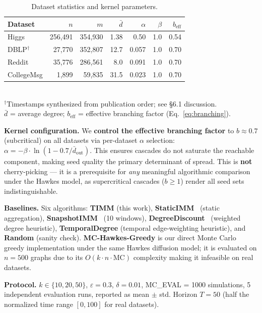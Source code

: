 \documentclass[10pt,conference]{IEEEtran}
\begin{document}
\begin{table}[t]
\centering
\caption{Dataset statistics and kernel parameters.}
\label{tab:datasets}
\small
\begin{tabular}{lrrrrrr}
\toprule
Dataset & $n$ & $m$ & $\bar{d}$ & $\alpha$ & $\beta$ & $b_{\text{eff}}$ \\
\midrule
Higgs & 256,491 & 354,930 & 1.38 & 0.50 & 1.0 & 0.54 \\
DBLP$^\dagger$ & 27,770 & 352,807 & 12.7 & 0.057 & 1.0 & 0.70 \\
Reddit & 35,776 & 286,561 & 8.0 & 0.091 & 1.0 & 0.70 \\
CollegeMsg & 1,899 & 59,835 & 31.5 & 0.023 & 1.0 & 0.70 \\
\bottomrule
\end{tabular}\\[3pt]
\footnotesize
$^\dagger$Timestamps synthesized from publication order; see \S6.1 discussion.\\
$\bar{d}$ = average degree; $b_{\text{eff}}$ = effective branching factor (Eq.~\ref{eq:branching}).
\end{table}

\textbf{Kernel configuration.}
We \textbf{control the effective branching factor} to $b \approx 0.7$ (subcritical) on all datasets via per-dataset $\alpha$ selection:
$\alpha = -\beta \cdot \ln(1 - 0.7 / \bar{d}_{\text{out}})$.
This ensures cascades do not saturate the reachable component, making seed quality the primary determinant of spread.
This is \textbf{not} cherry-picking — it is a prerequisite for \emph{any} meaningful algorithmic comparison under the Hawkes model, as supercritical cascades ($b \ge 1$) render all seed sets indistinguishable.

\textbf{Baselines.}
Six algorithms: \textbf{TIMM} (this work), \textbf{StaticIMM}~\cite{tang2015} (static aggregation), \textbf{SnapshotIMM}~\cite{ohsaka2016} (10 windows), \textbf{DegreeDiscount}~\cite{chen2009} (weighted degree heuristic), \textbf{TemporalDegree} (temporal edge-weighting heuristic), and \textbf{Random} (sanity check).
\textbf{MC-Hawkes-Greedy} is our direct Monte Carlo greedy implementation under the same Hawkes diffusion model; it is evaluated on $n=500$ graphs due to its $O(k \cdot n \cdot \text{MC})$ complexity making it infeasible on real datasets.

\textbf{Protocol.}
$k \in \{10, 20, 50\}$, $\varepsilon = 0.3$, $\delta = 0.01$, MC\_EVAL = 1000 simulations, 5 independent evaluation runs, reported as mean $\pm$ std.
Horizon $T = 50$ (half the normalized time range $[0, 100]$ for real datasets).
\end{document}
